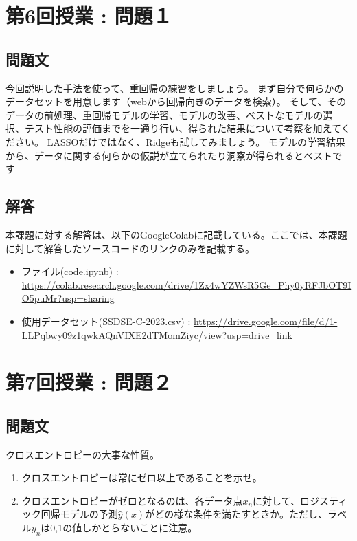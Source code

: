 \documentclass{article}[jsarticle]
\begin{document}
\section{第6回授業 : 問題１}

    \subsection{問題文}
    今回説明した手法を使って、重回帰の練習をしましょう。
    まず自分で何らかのデータセットを用意します（webから回帰向きのデータを検索）。
    そして、そのデータの前処理、重回帰モデルの学習、モデルの改善、ベストなモデルの選択、テスト性能の評価までを一通り行い、得られた結果について考察を加えてください。
    LASSOだけではなく、Ridgeも試してみましょう。
    モデルの学習結果から、データに関する何らかの仮説が立てられたり洞察が得られるとベストです
    \subsection{解答}
    本課題に対する解答は、以下のGoogleColabに記載している。ここでは、本課題に対して解答したソースコードのリンクのみを記載する。
    \begin{itemize}
        \item ファイル(code.ipynb) : \url{https://colab.research.google.com/drive/1Zx4wYZWsR5Ge_Phy0yRFJbOT9IO5puMr?usp=sharing}
        \item 使用データセット(SSDSE-C-2023.csv) : \url{https://drive.google.com/file/d/1-LLPqbwy09z1qwkAQnVIXE2dTMomZiyc/view?usp=drive_link}
    \end{itemize}


\section{第7回授業 : 問題２}

    \subsection{問題文}
    クロスエントロピーの大事な性質。
    \begin{enumerate}
        \item クロスエントロピーは常にゼロ以上であることを示せ。
        \item クロスエントロピーがゼロとなるのは、各データ点$x_n$に対して、ロジスティック回帰モデルの予測$\hat{y}(x)$がどの様な条件を満たすときか。ただし、ラベル$y_n$は0,1の値しかとらないことに注意。
    \end{enumerate}
\end{document}
